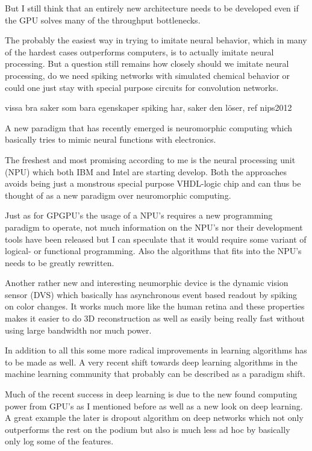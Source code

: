 \documentclass{article}
\begin{document}
    But I still think that an entirely new architecture needs to be developed 
    even if the GPU solves many of the throughput bottlenecks.
    
    The probably the easiest way in trying to imitate neural behavior, 
    which in many of the hardest cases outperforms computers, is to actually
    imitate neural processing. But a question still remains how closely should
    we imitate neural processing, do we need spiking networks with simulated
    chemical behavior or could one just stay with special purpose circuits 
    for convolution networks.

    vissa bra saker som bara egenskaper spiking har, saker den löser, ref nips2012

    A new paradigm that has recently emerged is neuromorphic
    computing which basically tries to mimic neural functions with electronics.
    
    The freshest and most promising according to me is the 
    neural processing unit (NPU) which both IBM\cite{synapse} and
    Intel\cite{intelneuro} are starting develop. Both the approaches avoids being
    just a monstrous special purpose VHDL-logic chip and can thus be thought of
    as a new paradigm over neuromorphic computing.

    Just as for GPGPU's the usage of a NPU's requires a new programming paradigm to
    operate, not much information on the NPU's nor their development tools
    have been released but I can speculate that it would require some variant of
    logical- or functional programming. Also the algorithms that fits into the
    NPU's needs to be greatly rewritten.
    
    Another rather new and interesting neumorphic device is the
    dynamic vision sensor (DVS) which basically has asynchronous event based
    readout by spiking on color changes.\cite{dvs} It works much more like the human retina and
    these properties makes it easier to do 3D reconstruction as well as easily
    being really fast without using large bandwidth nor much power.

    In addition to all this some more radical improvements in learning
    algorithms has to be made as well. A very recent shift towards deep
    learning algorithms in the machine learning community that probably can be
    described as a paradigm shift. 
   
    Much of the recent success in deep learning is due to the new found computing
    power from 
    GPU's as I mentioned before as well as a new look on deep learning. A great
    example the later is dropout algorithm on deep networks which not only
    outperforms the rest on the podium but also is much less ad hoc by
    basically only log some of the features.\cite{dropout}
\end{document}
